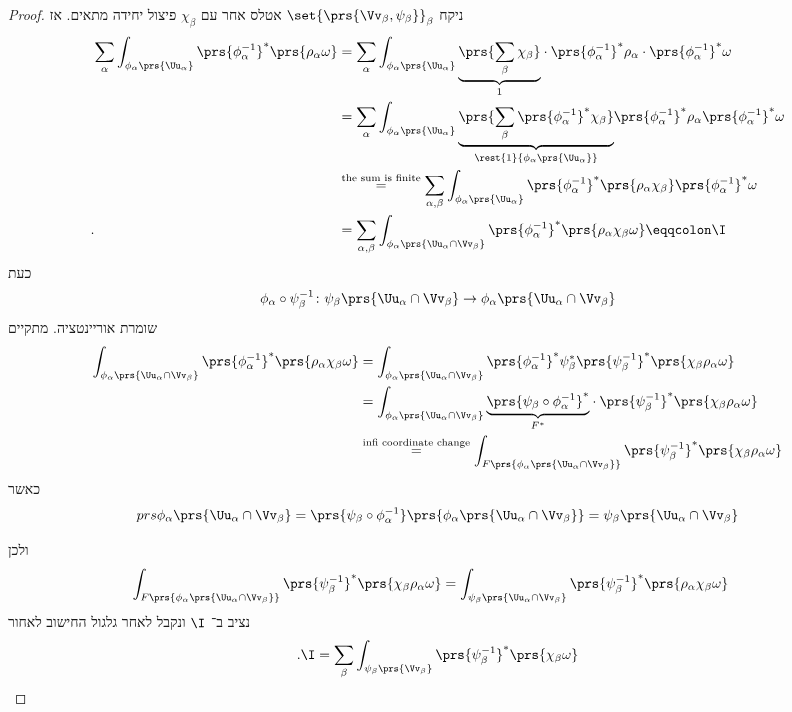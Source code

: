 \documentclass[a4paper,10pt,twoside,openany]{book}
\begin{document}
\begin{proof}
ניקח
$\set{\prs{\Vv_{\beta},\psi_{\beta}}}_{\beta}$
אטלס אחר עם
$\chi_{\beta}$
פיצול יחידה מתאים.
אז
\begin{align*}
\sum_{\alpha} \int_{\phi_{\alpha}\prs{\Uu_{\alpha}}} \prs{\phi_{\alpha}^{-1}}^* \prs{\rho_{\alpha} \omega} &= \sum_{\alpha} \int_{\phi_{\alpha}\prs{\Uu_{\alpha}}} \underset{1}{\underbrace{\prs{\sum_{\beta} \chi_\beta}}}\cdot \prs{\phi_{\alpha}^{-1}}^* \rho_{\alpha} \cdot \prs{\phi_{\alpha}^{-1}}^* \omega \\&= \sum_{\alpha} \int_{\phi_{\alpha}\prs{\Uu_{\alpha}}} \underset{\rest{1}{\phi_{\alpha}\prs{\Uu_{\alpha}}}}{\underbrace{\prs{\sum_{\beta} \prs{\phi_{\alpha}^{-1}}^* \chi_{\beta}}}} \prs{\phi_{\alpha}^{-1}}^* \rho_{\alpha} \prs{\phi_{\alpha}^{-1}}^* \omega \\&\stackrel{\text{the sum is finite}}{=}
\sum_{\alpha,\beta} \int_{\phi_{\alpha}\prs{\Uu_{\alpha}}} \prs{\phi_{\alpha}^{-1}}^* \prs{\rho_{\alpha} \chi_{\beta}}\prs{\phi_{\alpha}^{-1}}^* \omega \\ \text{.} \phantom{\sum_{\alpha} \int_{\phi_{\alpha}\prs{\Uu_{\alpha}}} \prs{\phi_{\alpha}^{-1}}^* \prs{\rho_{\alpha} \omega}} &= \sum_{\alpha, \beta} \int_{\phi_{\alpha}\prs{\Uu_{\alpha} \cap \Vv_{\beta}}} \prs{\phi_{\alpha}^{-1}}^* \prs{\rho_{\alpha} \chi_{\beta} \omega} \eqqcolon \I
\end{align*}
כעת
\[\phi_{\alpha} \circ \psi_{\beta}^{-1} \colon \psi_{\beta} \prs{\Uu_{\alpha} \cap \Vv_{\beta}} \to \phi_{\alpha} \prs{\Uu_{\alpha} \cap \Vv_{\beta}}\]
שומרת אוריינטציה.
מתקיים
\begin{align*}
\int_{\phi_{\alpha}\prs{\Uu_{\alpha} \cap \Vv_{\beta}}} \prs{\phi_{\alpha}^{-1}}^* \prs{\rho_{\alpha} \chi_{\beta} \omega} &=
\int_{\phi_{\alpha}\prs{\Uu_{\alpha} \cap \Vv_{\beta}}} \prs{\phi_{\alpha}^{-1}}^* \psi_{\beta}^* \prs{\psi_{\beta}^{-1}}^* \prs{\chi_{\beta} \rho_{\alpha} \omega} \\&= \int_{\phi_{\alpha}\prs{\Uu_{\alpha} \cap \Vv_{\beta}}} \underset{F^*}{\underbrace{\prs{\psi_{\beta} \circ \phi_{\alpha}^{-1}}^*}} \cdot \prs{\psi_{\beta}^{-1}}^* \prs{\chi_{\beta} \rho_{\alpha} \omega} \\&\stackrel{\text{infi coordinate change}}{=}
\int_{F\prs{\phi_{\alpha}\prs{\Uu_{\alpha} \cap \Vv_{\beta}}}} \prs{\psi_{\beta}^{-1}}^* \prs{\chi_{\beta} \rho_{\alpha} \omega}
\end{align*}
כאשר
\[prs{\phi_{\alpha}\prs{\Uu_{\alpha} \cap \Vv_{\beta}}} = \prs{\psi_{\beta} \circ \phi_{\alpha}^{-1}}\prs{\phi_{\alpha}\prs{\Uu_{\alpha} \cap \Vv_{\beta}}} = \psi_{\beta}\prs{\Uu_{\alpha} \cap \Vv_{\beta}}\]

ולכן
\begin{align*}
\int_{F\prs{\phi_{\alpha}\prs{\Uu_{\alpha} \cap \Vv_{\beta}}}} \prs{\psi_{\beta}^{-1}}^* \prs{\chi_{\beta} \rho_{\alpha} \omega} &= \int_{ \psi_{\beta}\prs{\Uu_{\alpha} \cap \Vv_{\beta}}} \prs{\psi_{\beta}^{-1}}^* \prs{\rho_{\alpha} \chi_{\beta} \omega}
\end{align*}
נציב ב־%
$\I$
ונקבל לאחר גלגול החישוב לאחור
\[\text{.} \I = \sum_{\beta} \int_{\psi_{\beta}\prs{\Vv_{\beta}}} \prs{\psi_{\beta}^{-1}}^* \prs{\chi_{\beta}\omega}\]
\end{proof}
\end{document}

